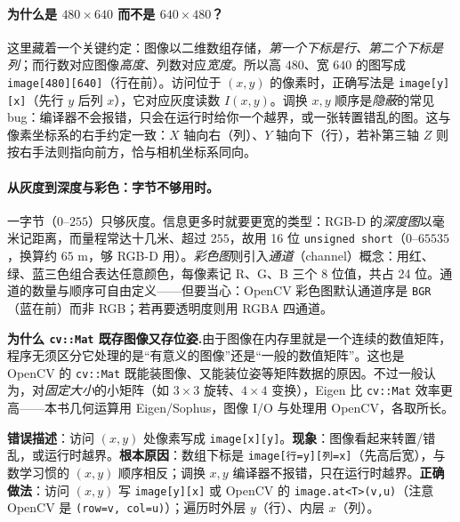 \paragraph{为什么是 $480\times640$ 而不是 $640\times480$？}
这里藏着一个关键约定\cite{gaoxiang2019slam14}：图像以二维数组存储，\emph{第一个下标是行、第二个下标是列}；而行数对应图像\emph{高度}、列数对应\emph{宽度}。所以高 $480$、宽 $640$ 的图写成 \texttt{image[480][640]}（行在前）。访问位于 $(x,y)$ 的像素时，正确写法是 \texttt{image[y][x]}（先行 $y$ 后列 $x$），它对应灰度读数 $I(x,y)$。调换 $x,y$ 顺序是\emph{隐蔽}的常见 bug：编译器不会报错，只会在运行时给你一个越界，或一张转置错乱的图\cite{gaoxiang2019slam14}。这与像素坐标系的右手约定一致：$X$ 轴向右（列）、$Y$ 轴向下（行），若补第三轴 $Z$ 则按右手法则指向前方，恰与相机坐标系同向。

\paragraph{从灰度到深度与彩色：字节不够用时。}
一字节（$0\text{–}255$）只够灰度。信息更多时就要更宽的类型\cite{gaoxiang2019slam14}：RGB-D 的\emph{深度图}以毫米记距离，而量程常达十几米、超过 $255$，故用 16 位 \texttt{unsigned short}（$0\text{–}65535$，换算约 $65$ m，够 RGB-D 用）。\emph{彩色图}则引入\emph{通道}（channel）概念：用红、绿、蓝三色组合表达任意颜色，每像素记 R、G、B 三个 8 位值，共占 24 位。通道的数量与顺序可自由定义——但要当心：OpenCV 彩色图默认通道序是 \texttt{BGR}（蓝在前）而非 RGB；若再要透明度则用 RGBA 四通道。

\begin{note}
\textbf{为什么 \texttt{cv::Mat} 既存图像又存位姿.}\;由于图像在内存里就是一个连续的数值矩阵，程序无须区分它处理的是“有意义的图像”还是“一般的数值矩阵”\cite{gaoxiang2019slam14}。这也是 OpenCV 的 \texttt{cv::Mat} 既能装图像、又能装位姿等矩阵数据的原因。不过一般认为，对\emph{固定大小}的小矩阵（如 $3\times3$ 旋转、$4\times4$ 变换），Eigen 比 \texttt{cv::Mat} 效率更高——本书几何运算用 Eigen/Sophus，图像 I/O 与处理用 OpenCV，各取所长。
\end{note}

\begin{pitfall}
\textbf{错误描述}：访问 $(x,y)$ 处像素写成 \texttt{image[x][y]}。\textbf{现象}：图像看起来转置/错乱，或运行时越界。\textbf{根本原因}：数组下标是 \texttt{image[行=y][列=x]}（先高后宽），与数学习惯的 $(x,y)$ 顺序相反；调换 $x,y$ 编译器不报错，只在运行时越界\cite{gaoxiang2019slam14}。\textbf{正确做法}：访问 $(x,y)$ 写 \texttt{image[y][x]} 或 OpenCV 的 \texttt{image.at<T>(v,u)}（注意 OpenCV 是 \texttt{(row=v, col=u)}）；遍历时外层 $y$（行）、内层 $x$（列）。
\end{pitfall}

